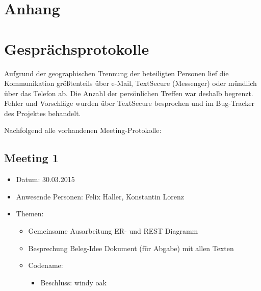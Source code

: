 \documentclass[12pt]{scrartcl}
\begin{document}
	\newpage	
	\appendix
	\setcounter{page}{1}
	\section*{Anhang}
	
	\section{Gesprächsprotokolle}
		Aufgrund der geographischen Trennung der beteiligten Personen lief die Kommunikation größtenteils über e-Mail, TextSecure (Messenger) oder mündlich über das Telefon ab. Die Anzahl der persönlichen Treffen war deshalb begrenzt. Fehler und Vorschläge wurden über TextSecure besprochen und im Bug-Tracker des Projektes behandelt.
		
		Nachfolgend alle vorhandenen Meeting-Protokolle:
		\subsection{Meeting 1}
			\begin{itemize}
				\item Datum: 30.03.2015
				\item Anwesende Personen: Felix Haller, Konstantin Lorenz
				\item Themen:
				\begin{itemize}
					\item Gemeinsame Ausarbeitung ER- und REST Diagramm
					\item Besprechung Beleg-Idee Dokument (für Abgabe) mit allen Texten
					\item Codename:
					\begin{itemize}
						\item Beschluss: windy oak
					\end{itemize}
				\end{itemize}
			\end{itemize}
		
\end{document}
